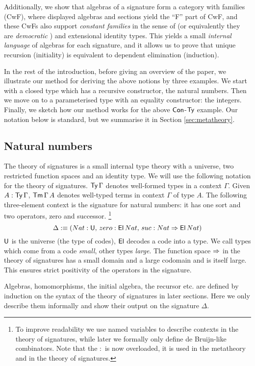\documentclass[acmsmall,review,anonymous]{acmart}\settopmatter{printfolios=true,printccs=false,printacmref=false}
\begin{document}
Additionally, we show that algebras of a signature form a category
with families (CwF), where displayed algebras and sections yield the
``F'' part of CwF, and these CwFs also support \emph{constant
  families} in the sense of \cite[p.~74]{forsberg-phd} (or
equivalently they are \emph{democratic} \cite{clairambault2014biequivalence}) and extensional
identity types. This yields a small \emph{internal language} of
algebras for each signature, and it allows us to prove that unique
recursion (initiality) is equivalent to dependent elimination (induction).

In the rest of the introduction, before giving an overview of the
paper, we illustrate our method for deriving the above notions by
three examples. We start with a closed type which has a recursive
constructor, the natural numbers. Then we move on to a parameterised
type with an equality constructor: the integers. Finally, we sketch
how our method works for the above $\mathsf{Con}$-$\mathsf{Ty}$ example. Our notation
below is standard, but we summarise it in Section
\ref{sec:metatheory}.

\subsection{Natural numbers}
\label{sec:naturals}

The theory of signatures is a small internal type theory with a
universe, two restricted function spaces and an identity type. We will
use the following notation for the theory of signatures. $\mathsf{Ty}\,\Gamma$
denotes well-formed types in a context $\Gamma$. Given
$A:\mathsf{Ty}\,\Gamma$, $\mathsf{Tm}\,\Gamma\,A$ denotes well-typed terms in context
$\Gamma$ of type $A$. The following three-element context is the
signature for natural numbers: it has one sort and two operators, zero
and successor.
\footnote{To improve readability we use named variables to describe
  contexts in the theory of signatures, while later we formally only define
  de Bruijn-like combinators. Note that the $:$ is now overloaded, it
  is used in the metatheory and in the theory of signatures.}
\[
\Delta :\equiv (Nat:\mathsf{U},\,zero:\mathsf{El}\,Nat,\,suc:Nat\Rightarrow \mathsf{El}\,Nat)
\]
$\mathsf{U}$ is the universe (the type of codes), $\mathsf{El}$ decodes a code into a
type. We call types which come from a code {\em small}, other types
{\em large}. The function space $\Rightarrow$ in the theory of signatures
has a small domain and a large codomain and is itself large. This
ensures strict positivity of the operators in the signature.

Algebras, homomorphisms, the initial algebra, the recursor etc. are
defined by induction on the syntax of the theory of signatures in
later sections. Here we only describe them informally and show their
output on the signature $\Delta$.
\end{document}
